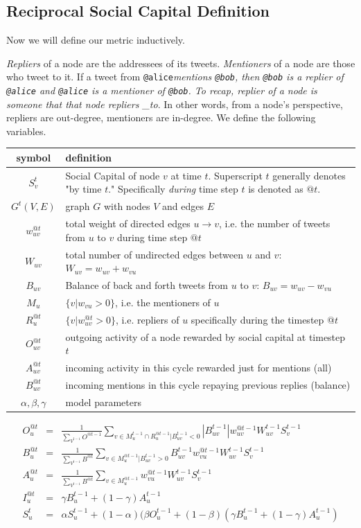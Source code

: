 \documentclass[10pt,oneside]{memoir}
\begin{document}
\begin{Spacing}{2}
\pagebreak \section{Reciprocal Social Capital Definition}
\label{reciprocalsocialcapitaldefinition}

Now we will define our metric inductively.


{\itshape Repliers} of a node are the addressees of its tweets. {\itshape Mentioners} of a node are those who tweet to it. If a tweet from \texttt{@alice}{\itshape mentions \texttt{@bob}, then \texttt{@bob} is a replier of \texttt{@alice} and \texttt{@alice} is a mentioner of \texttt{@bob}. To recap, replier of a node is someone that that node repliers \_to}. In other words, from a node's perspective, repliers are out-degree, mentioners are in-degree.  We define the following variables.



\begin{tabular}{|c|p{4in}|}
\hline 
symbol & definition\tabularnewline
\hline
\hline 
$S_{v}^{t}$ & Social Capital of node $v$ at time $t$. Superscript $t$ generally
denotes "by time $t$." Specifically \emph{during} time step
$t$ is denoted as $@t$.\tabularnewline
\hline 
$G^{t}(V,E)$ & graph $G$ with nodes $V$ and edges $E$\tabularnewline
\hline 
$w_{uv}^{@t}$ & total weight of directed edges $u\rightarrow v$, i.e. the number
of tweets from $u$ to $v$ during time step $@t$\tabularnewline
\hline 
$W_{uv}$ & total number of undirected edges between $u$ and $v$: $W_{uv}=w_{uv}+w_{vu}$\tabularnewline
\hline 
$B_{uv}$ & Balance of back and forth tweets from $u$ to $v$: $B_{uv}=w_{uv}-w_{vu}$\tabularnewline
\hline 
$M_{u}$ & $\{v|w_{vu}>0\}$, i.e. the mentioners of $u$\tabularnewline
\hline 
$R_{u}^{@t}$ & $\{v|w_{uv}^{@t}>0\}$, i.e. repliers of $u$ specifically during
the timestep @$t$\tabularnewline
\hline 
$O_{uv}^{@t}$ & outgoing activity of a node rewarded by social capital at timestep
$t$\tabularnewline
\hline 
$A_{uv}^{@t}$ & incoming activity in this cycle rewarded just for mentions (all)\tabularnewline
\hline 
$B_{uv}^{@t}$ & incoming mentions in this cycle repaying previous replies (balance)\tabularnewline
\hline 
$\alpha,\beta,\gamma$ & model parameters\tabularnewline
\hline
\end{tabular}
\begin{eqnarray}
O_{u}^{@t} & = & \frac{1}{\sum_{V^{t-1}}O^{@t-1}}\sum_{v\in M_{u}^{t-1}\cap R_{u}^{@t-1}|B_{uv}^{t-1}<0}|B_{uv}^{t-1}|w_{uv}^{@t-1}W_{uv}^{t-1}S_{v}^{t-1}\\
B_{u}^{@t} & = & \frac{1}{\sum_{V^{t-1}}B^{@t}}\sum_{v\in M_{u}^{@t-1}|B_{uv}^{t-1}>0}B_{uv}^{t-1}w_{vu}^{@t-1}W_{uv}^{t-1}S_{v}^{t-1}\\
A_{u}^{@t} & = & \frac{1}{\sum_{V^{t-1}}B^{@t}}\sum_{v\in M_{u}^{@t-1}}w_{vu}^{@t-1}W_{uv}^{t-1}S_{v}^{t-1}\\
I_{u}^{@t} & = & \gamma B_{u}^{t-1}+(1-\gamma)A_{u}^{t-1}\\
S_{u}^{t} & = & \alpha S_{u}^{t-1}+(1-\alpha)(\beta O_{u}^{t-1}+(1-\beta)(\gamma B_{u}^{t-1}+(1-\gamma)A_{u}^{t-1})
\end{eqnarray}


\end{Spacing}
\end{document}
